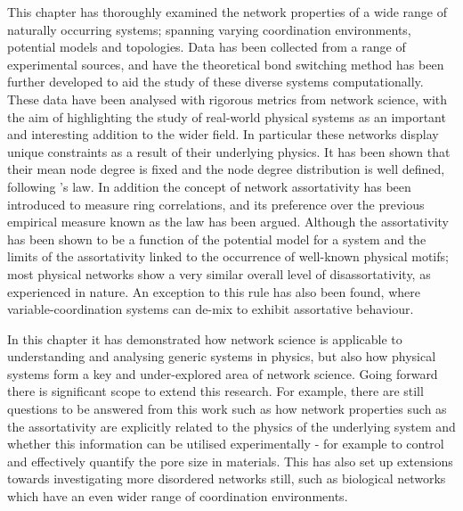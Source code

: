 This chapter has thoroughly examined the network properties of a wide range of naturally occurring \td{} systems; spanning varying coordination environments, potential models and topologies.
Data has been collected from a range of experimental sources, and have the theoretical bond switching method has been further developed to aid the study of these diverse systems computationally.
These data have been analysed with rigorous metrics from network science, with the aim of highlighting the study of real\--world physical systems as an important and interesting addition to the wider field.
In particular these networks display unique constraints as a result of their underlying physics.
It has been shown that their mean node degree is fixed and the node degree distribution is well defined, following \lm's law.
In addition the concept of network assortativity has been introduced to measure ring correlations, and its preference over the previous empirical measure known as the \aw{} law has been argued.
Although the assortativity has been shown to be a function of the potential model for a system and the limits of the assortativity linked to the occurrence of well\--known physical motifs; most physical networks show a very similar overall level of disassortativity, as experienced in nature.
An exception to this rule has also been found, where variable\--coordination systems can de\--mix to exhibit assortative behaviour.

In this chapter it has demonstrated how network science is applicable to understanding and analysing generic systems in physics, but also how physical systems form a key and under\--explored area of network science.
Going forward there is significant scope to extend this research.
For example, there are still questions to be answered from this work such as how network properties such as the assortativity are explicitly related to the physics of the underlying system and whether this information can be utilised experimentally \-- for example to control and effectively quantify the pore size in materials.
This has also set up extensions towards investigating more disordered networks still, such as biological networks which have an even wider range of coordination environments.



 



